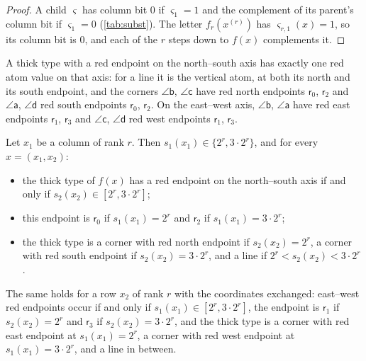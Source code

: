 \begin{proof}
A child $\varsigma$ has column bit $0$ if $\varsigma_1=1$ and the complement of its parent's column bit if $\varsigma_1=0$ (\cref{tab:subst}). The letter $f_r(x^{(r)})$ has $\varsigma_{r,1}(x)=1$, so its column bit is $0$, and each of the $r$ steps down to $f(x)$ complements it.
\end{proof}

A thick type with a red endpoint on the north--south axis has exactly one red atom value on that axis: for a line it is the vertical atom, at both its north and its south endpoint, and the corners $\angle\mathsf b$, $\angle\mathsf c$ have red north endpoints $\mathsf r_0$, $\mathsf r_2$ and $\angle\mathsf a$, $\angle\mathsf d$ red south endpoints $\mathsf r_0$, $\mathsf r_2$. On the east--west axis, $\angle\mathsf b$, $\angle\mathsf a$ have red east endpoints $\mathsf r_1$, $\mathsf r_3$ and $\angle\mathsf c$, $\angle\mathsf d$ red west endpoints $\mathsf r_1$, $\mathsf r_3$.

\begin{lemma}\label{app:red}
Let $x_1$ be a column of rank $r$. Then $s_1(x_1)\in\{2^r,3\cdot2^r\}$, and for every $x=(x_1,x_2)$:
\begin{itemize}
\item[(a)] the thick type of $f(x)$ has a red endpoint on the north--south axis if and only if $s_2(x_2)\in[2^r,3\cdot2^r]$;
\item[(b)] this endpoint is $\mathsf r_0$ if $s_1(x_1)=2^r$ and $\mathsf r_2$ if $s_1(x_1)=3\cdot2^r$;
\item[(c)] the thick type is a corner with red north endpoint if $s_2(x_2)=2^r$, a corner with red south endpoint if $s_2(x_2)=3\cdot2^r$, and a line if $2^r<s_2(x_2)<3\cdot2^r$.
\end{itemize}
The same holds for a row $x_2$ of rank $r$ with the coordinates exchanged: east--west red endpoints occur if and only if $s_1(x_1)\in[2^r,3\cdot2^r]$, the endpoint is $\mathsf r_1$ if $s_2(x_2)=2^r$ and $\mathsf r_3$ if $s_2(x_2)=3\cdot2^r$, and the thick type is a corner with red east endpoint at $s_1(x_1)=2^r$, a corner with red west endpoint at $s_1(x_1)=3\cdot2^r$, and a line in between.
\end{lemma}

